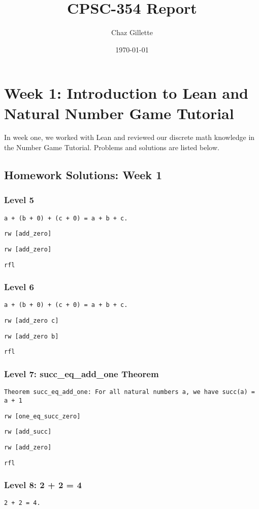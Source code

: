 \documentclass{article}
\title{CPSC-354 Report}
\author{Chaz Gillette}
\date{\today}
\begin{document}
\maketitle
\tableofcontents

\section*{Week 1: Introduction to Lean and Natural Number Game Tutorial}
In week one, we worked with Lean and reviewed our discrete math knowledge in the Number Game Tutorial. Problems and solutions are listed below.

\subsection*{Homework Solutions: Week 1}

\subsubsection*{Level 5}
\texttt{a + (b + 0) + (c + 0) = a + b + c.}

\texttt{rw [add\_zero]}

\texttt{rw [add\_zero]}

\texttt{rfl}

\subsubsection*{Level 6}
\texttt{a + (b + 0) + (c + 0) = a + b + c.}

\texttt{rw [add\_zero c]}

\texttt{rw [add\_zero b]}

\texttt{rfl}

\subsubsection*{Level 7: succ\_eq\_add\_one Theorem}
\texttt{Theorem succ\_eq\_add\_one: For all natural numbers a, we have succ(a) = a + 1}

\texttt{rw [one\_eq\_succ\_zero]}

\texttt{rw [add\_succ]}

\texttt{rw [add\_zero]}

\texttt{rfl}

\subsubsection*{Level 8: 2 + 2 = 4}
\texttt{2 + 2 = 4.}
\end{document}
